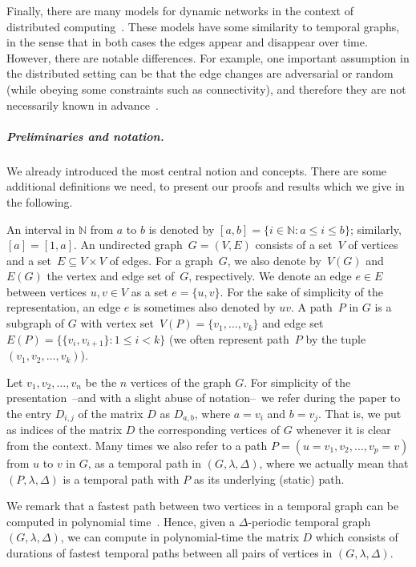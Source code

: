 \documentclass[a4paper,UKenglish,cleveref, autoref, thm-restate, anonymous]{lipics-v2021}
\begin{document}
Finally, there are many models for dynamic networks in the context of distributed computing~\cite{Kuhn2011Dynamic}. 
These models have some similarity to temporal graphs, in the sense that in both cases the edges appear and disappear over time. 
However, there are notable differences. For example, one important assumption in the distributed setting 
can be that the edge changes are adversarial or random (while obeying some constraints such as connectivity), 
and therefore they are not necessarily known in advance~\cite{Kuhn2011Dynamic}. 




\subparagraph{Preliminaries and notation.}
We already introduced the most central notion and concepts. There are some additional definitions we need, to present our proofs and results which we give in the following. 

An interval in $\mathbb N$ from $a$ to $b$ is denoted by $[a,b] = \{ i\in \mathbb N  :  a \leq i \leq b\}$; similarly, $[a] = [1,a]$.
An undirected graph~$G=(V,E)$ consists of a set~$V$ of vertices 
and a set~$E \subseteq V \times V$ of edges.
For a graph~$G$, we also denote by~$V(G)$ and~$E(G)$ the vertex and edge set of~$G$, respectively.
We denote an edge $e \in E$ between vertices $u,v \in V$ as a set $e=\{u,v\}$.
For the sake of simplicity of the representation, an edge $e$ is sometimes also denoted by $uv$. 
A path~$P$ in $G$ is a subgraph of $G$ with vertex set~$V(P)=\{v_1,\dots,v_k\}$ and edge set~$E(P)=\{\{v_i,v_{i+1}\} :  1\leq i<k\}$
(we often represent path~$P$ by the tuple~$(v_1,v_2,\dots,v_k)$).





Let $v_1,v_2,\ldots,v_n$ be the $n$ vertices of the graph $G$. 
For simplicity of the presentation~--and with a slight abuse of notation--~we refer during the paper to the entry $D_{i,j}$ of the matrix $D$ as 
$D_{a,b}$, where $a=v_i$ and $b=v_j$. That is, we put as indices of the matrix $D$ the corresponding vertices of $G$ whenever it is clear from the context.
Many times we also refer to a path $P=(u=v_1, v_2, \dots, v_p=v)$ from $u$ to $v$ in $G$,
as a temporal path in $(G,\lambda,\Delta)$,
where we actually mean that $(P,\lambda,\Delta)$ is a temporal path with $P$ as its underlying (static) path.


We remark that a fastest path between two vertices in a temporal graph can be computed in polynomial time~\cite{xuan_computing_2003,Wu2016Efficient}.
Hence, given a $\Delta$-periodic temporal graph $(G,\lambda,\Delta)$, we can compute in polynomial-time  the matrix $D$
which consists of durations of fastest temporal paths between all pairs of vertices in $(G,\lambda,\Delta)$.
\end{document}
